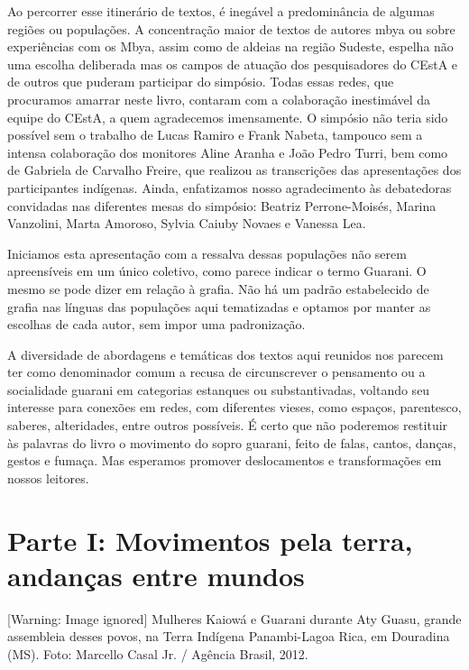 \documentclass{article}
\begin{document}
Ao percorrer esse itiner\'ario de textos, \'e ineg\'avel a
predomin\^ancia de algumas regi\~oes ou popula\c{c}\~oes. A
concentra\c{c}\~ao maior de textos de autores mbya ou sobre
experi\^encias com os Mbya, assim como de aldeias na regi\~ao Sudeste,
espelha n\~ao uma escolha deliberada mas os campos de atua\c{c}\~ao dos
pesquisadores do CEstA e de outros que puderam participar do
simp\'osio. Todas essas redes, que procuramos amarrar neste livro,
contaram com a colabora\c{c}\~ao inestim\'avel da equipe do CEstA, a
quem agradecemos imensamente. O simp\'osio n\~ao teria sido poss\'ivel
sem o trabalho de Lucas Ramiro e Frank Nabeta, tampouco sem a intensa
colabora\c{c}\~ao dos monitores Aline Aranha e Jo\~ao Pedro Turri, bem
como de Gabriela de Carvalho Freire, que realizou as transcri\c{c}\~oes
das apresenta\c{c}\~oes dos participantes ind\'igenas. Ainda,
enfatizamos nosso agradecimento \`as debatedoras convidadas nas
diferentes mesas do simp\'osio: Beatriz Perrone-Mois\'es, Marina
Vanzolini, Marta Amoroso, Sylvia Caiuby Novaes e Vanessa Lea.

Iniciamos esta apresenta\c{c}\~ao com a ressalva dessas popula\c{c}\~oes
n\~ao serem apreens\'iveis em um \'unico coletivo, como parece indicar
o termo Guarani. O mesmo se pode dizer em rela\c{c}\~ao \`a grafia.
N\~ao h\'a um padr\~ao estabelecido de grafia nas l\'inguas das
popula\c{c}\~oes aqui tematizadas e optamos por manter as escolhas de
cada autor, sem impor uma padroniza\c{c}\~ao. 

A diversidade de abordagens e tem\'aticas dos textos aqui reunidos nos
parecem ter como denominador comum a recusa de circunscrever o
pensamento ou a socialidade guarani em categorias estanques ou
substantivadas, voltando seu interesse para conex\~oes em redes, com
diferentes vieses, como espa\c{c}os, parentesco, saberes, alteridades,
entre outros poss\'iveis. \'E certo que n\~ao poderemos restituir \`as
palavras do livro o movimento do sopro guarani, feito de falas, cantos,
dan\c{c}as, gestos e fuma\c{c}a. Mas esperamos promover deslocamentos e
transforma\c{c}\~oes em nossos leitores. 

\section[Parte I: Movimentos pela terra, andan\c{c}as entre
mundos]{Parte I: Movimentos pela terra, andan\c{c}as entre mundos}
  [Warning: Image ignored] %
 Mulheres Kaiow\'a e Guarani durante Aty Guasu, grande assembleia desses
povos, na Terra Ind\'igena Panambi-Lagoa Rica, em Douradina (MS). Foto:
Marcello Casal Jr. / Ag\^encia Brasil, 2012.
\end{document}

